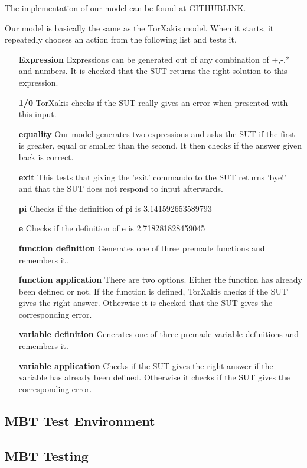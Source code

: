 \documentclass[11pt,a4paper]{article}
\begin{document}
The implementation of our model can be found at GITHUBLINK.

Our model is basically the same as the TorXakis model. When it starts, it repeatedly chooses an action from the following list and tests it.
\begin{itemize}
	\item[\textbf{Expression}] Expressions can be generated out of any combination of +,-,* and numbers. It is checked that the SUT returns the right solution to this expression.
	\item[\textbf{1/0}] TorXakis checks if the SUT really gives an error when presented with this input.
	\item[\textbf{equality}] Our model generates two expressions and asks the SUT if the first is greater, equal or smaller than the second. It then checks if the answer given back is correct.
	\item[\textbf{exit}] This tests that giving the 'exit' commando to the SUT returns 'bye!' and that the SUT does not respond to input afterwards.
	\item[\textbf{pi}] Checks if the definition of pi is 3.141592653589793
	\item[\textbf{e}] Checks if the definition of e is 2.718281828459045
	\item[\textbf{function definition}] Generates one of three premade functions and remembers it.
	\item[\textbf{function application}] There are two options. Either the function has already been defined or not. If the function is defined, TorXakis checks if the SUT gives the right answer. Otherwise it is checked that the SUT gives the corresponding error.
	\item[\textbf{variable definition}] Generates one of three premade variable definitions and remembers it.
	\item[\textbf{variable application}] Checks if the SUT gives the right answer if the variable has already been defined. Otherwise it checks if the SUT gives the corresponding error.
\end{itemize}

\subsection{MBT Test Environment}
\subsection{MBT Testing}
\end{document}

